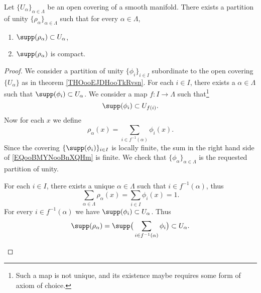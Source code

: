 \begin{proposition}	\label{PROPooOVQHooMNRQDH}
	Let \( \{ U_{\alpha} \}_{\alpha\in \Lambda}\) be an open covering of a smooth manifold. There exists a partition of unity \( \{ \rho_{\alpha} \}_{\alpha\in\Lambda}\) such that for every \( \alpha\in\Lambda\),
	\begin{enumerate}
		\item
		      \( \supp(\rho_{\alpha})\subset U_{\alpha}\),
		\item
		      \( \supp(\rho_{\alpha})\) is compact.
	\end{enumerate}
\end{proposition}

\begin{proof}
	We consider a partition of unity \( \{ \phi_i \}_{i\in I}\) subordinate to the open covering \( \{ U_{\alpha} \}\) as in theorem \ref{THOooEJDHooTkRvsn}. For each \( i\in I\), there exists a \( \alpha\in \Lambda\) such that \( \supp(\phi_i)\subset U_{\alpha}\). We consider a map \(f \colon I\to \Lambda  \) such that\footnote{Such a map is not unique, and its existence maybe requires some form of axiom of choice.}
	\begin{equation}
		\supp(\phi_i)\subset U_{f(i)}.
	\end{equation}
	Now for each \( x\) we define
	\begin{equation}		\label{EQooBMYNooBnXQHm}
		\rho_{\alpha}(x)=\sum_{i\in f^{-1}(\alpha)}\phi_i(x).
	\end{equation}
	Since the covering \(  \{ \supp(\phi_i) \}_{i\in I}   \) is locally finite, the sum in the right hand side of \eqref{EQooBMYNooBnXQHm} is finite. We check that \( \{ \phi_{\alpha} \}_{\alpha\in\Lambda}\) is the requested partition of unity.

	\begin{subproof}
		\spitem[Sum to \( 1\)]

		For each \( i\in I\), there exists a unique \( \alpha\in\Lambda\) such that \( i\in f^{-1}(\alpha)\), thus
		\begin{equation}
			\sum_{\alpha\in\Lambda}\rho_{\alpha}(x)=\sum_{i\in I}\phi_i(x)=1.
		\end{equation}
		\spitem[Support]
		For every \( i\in f^{-1}(\alpha)\) we have \( \supp(\phi_{i})\subset U_{\alpha}\). Thus
		\begin{equation}
			\supp(\rho_{\alpha})=\supp\big( \sum_{i\in f^{-1}(\alpha)}\phi_i \big)\subset U_{\alpha}.
		\end{equation}
	\end{subproof}
\end{proof}

